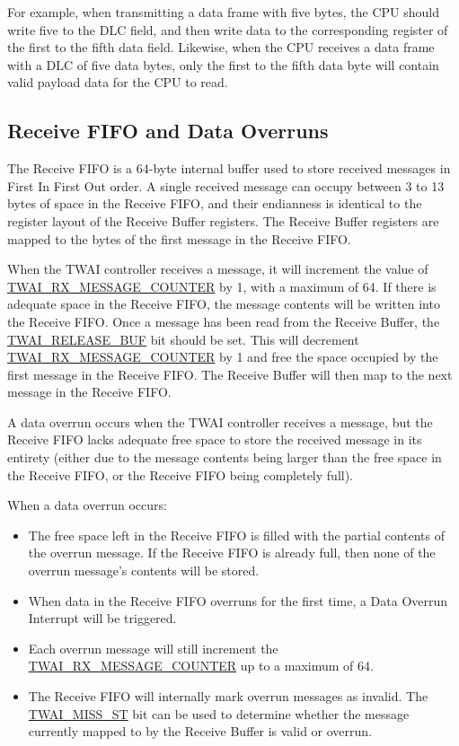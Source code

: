 \documentclass[main\_\_EN.tex]{subfiles}
\begin{document}
For example, when transmitting a data frame with five bytes, the CPU should write five to the DLC field, and then write data to the corresponding register of the first to the fifth data field. Likewise, when the CPU receives a data frame with a DLC of five data bytes, only the first to the fifth data byte will contain valid payload data for the CPU to read.

\subsection{Receive FIFO and Data Overruns}

The Receive FIFO is a 64-byte internal buffer used to store received messages in First In First Out order. A single received message can occupy between 3 to 13 bytes of space in the Receive FIFO, and their endianness is identical to the register layout of the Receive Buffer registers. The Receive Buffer registers are mapped to the bytes of the first message in the Receive FIFO.

When the TWAI controller receives a message, it will increment the value of \hyperref[fielddesc:TWAIRXMESSAGECOUNTER]{TWAI\_RX\_MESSAGE\_COUNTER} by 1, with a maximum of 64. If there is adequate space in the Receive FIFO, the message contents will be written into the Receive FIFO. Once a message has been read from the Receive Buffer, the \hyperref[fielddesc:TWAIRELEASEBUF]{TWAI\_RELEASE\_BUF} bit should be set. This will decrement \hyperref[fielddesc:TWAIRXMESSAGECOUNTER]{TWAI\_RX\_MESSAGE\_COUNTER} by 1 and free the space occupied by the first message in the Receive FIFO. The Receive Buffer will then map to the next message in the Receive FIFO.

A data overrun occurs when the TWAI controller receives a message, but the Receive FIFO lacks adequate free space to store the received message in its entirety (either due to the message contents being larger than the free space in the Receive FIFO, or the Receive FIFO being completely full). 

When a data overrun occurs:
\begin{itemize}
    \item The free space left in the Receive FIFO is filled with the partial contents of the overrun message. If the Receive FIFO is already full, then none of the overrun message’s contents will be stored.
    \item When data in the Receive FIFO overruns for the first time, a Data Overrun Interrupt will be triggered.
    \item Each overrun message will still increment the  \hyperref[fielddesc:TWAIRXMESSAGECOUNTER]{TWAI\_RX\_MESSAGE\_COUNTER} up to a maximum of 64.
    \item The Receive FIFO will internally mark overrun messages as invalid. The \hyperref[fielddesc:TWAIMISSST]{TWAI\_MISS\_ST} bit can be used to determine whether the message currently mapped to by the Receive Buffer is valid or overrun.
\end{itemize}
\end{document}
